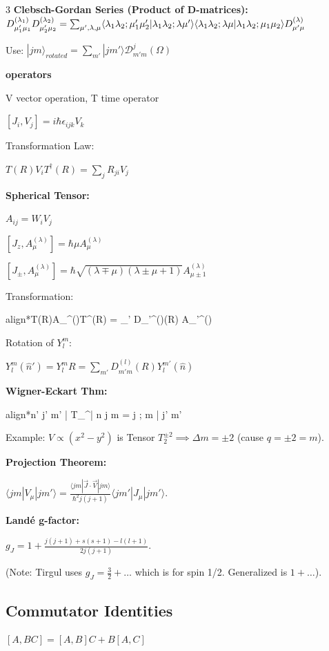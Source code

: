 \documentclass[10pt,a4paper]{article}
\newcommand{\important}[1]{\begin{empheq}[box=\fbox]{align*}#1\end{empheq}}
\begin{document}
\begin{multicols*}{3}
\textbf{Clebsch-Gordan Series (Product of D-matrices):}
$D_{\mu_1' \mu_1}^{(\lambda_1)} D_{\mu_2' \mu_2}^{(\lambda_2)} = \sum_{\mu', \lambda, \mu} \langle \lambda_1 \lambda_2; \mu_1' \mu_2' | \lambda_1 \lambda_2; \lambda \mu' \rangle \\\langle \lambda_1 \lambda_2; \lambda \mu | \lambda_1 \lambda_2; \mu_1 \mu_2 \rangle D_{\mu' \mu}^{(\lambda)}$


Use: $|jm\rangle_{rotated} = \sum_{m'} |jm'\rangle 
\mathcal{D}_{m'm}^j(\Omega)$

\textbf{operators}

V vector operation, T time operator

$[J_i, V_j] = i\hbar\epsilon_{ijk}V_k$

Transformation Law: 

$T(R)V_iT^\dagger(R) = \sum_j R_{ji}V_j$

\textbf{Spherical Tensor:}

$A_{ij}=W_iV_j$

$[J_z, A_\mu^{(\lambda)}] = \hbar\mu A_\mu^{(\lambda)}$

$[J_\pm, A_\mu^{(\lambda)}] = \hbar\sqrt{(\lambda \mp \mu)(\lambda \pm \mu + 1)} A_{\mu\pm 1}^{(\lambda)}$

Transformation: 
\important{T(R)A_\mu^{(\lambda)}T^\dagger(R) = \sum_{\mu'} D_{\mu'\mu}^{(\lambda)}(R) A_{\mu'}^{(\lambda)}}

Rotation of $Y_l^m$: 

$Y_l^m(\hat{n}') = Y_l^mR = \sum_{m'} D_{m'm}^{(l)}(R) Y_l^{m'}(\hat{n})$

\textbf{Wigner-Eckart Thm:}

\important{\langle n' j' m' | T_\lambda^\mu | n j m \rangle = \langle j \lambda; m \mu | j' m' \rangle \frac{\langle n' j' || T_\lambda || n j \rangle}{\sqrt{2j'+1}}}

Example: $V \propto (x^2-y^2)$ is Tensor $T_2^{\pm 2} \implies \Delta m = \pm 2$ (cause $q=\pm2=m$).


\textbf{Projection Theorem:}

$\langle jm|V_\mu|jm'\rangle = \frac{\langle jm|\vec{J}\cdot\vec{V}|jm\rangle}{\hbar^2 j(j+1)} \langle jm'|J_\mu|jm'\rangle$.

\textbf{Landé g-factor:} 

$g_J = 1 + \frac{j(j+1) + s(s+1) - l(l+1)}{2j(j+1)}$.

(Note: Tirgul uses $g_J = \frac{3}{2} + \dots$ which is for spin 1/2. Generalized is $1 + \dots$).

\subsection*{Commutator Identities}
$[A, BC] = [A, B]C + B[A, C]$


\end{multicols*}
\end{document}
